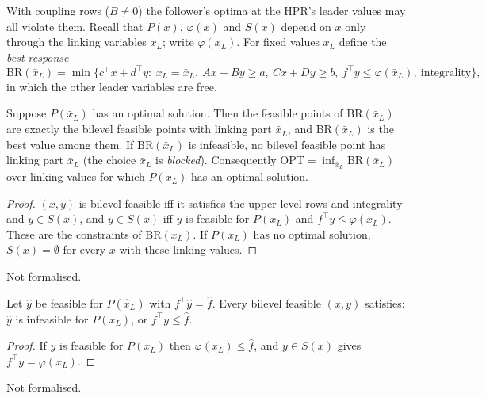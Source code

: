 With coupling rows ($B\neq 0$) the follower's optima at the HPR's leader
values may all violate them. Recall that $P(x)$, $\varphi(x)$ and $S(x)$ depend
on $x$ only through the linking variables $x_L$; write $\varphi(x_L)$. For fixed
values $\bar x_L$ define the \emph{best response}
\[
  \mathrm{BR}(\bar x_L)=\min\bigl\{c^{\top}x+d^{\top}y:\ x_L=\bar x_L,\ Ax+By\ge a,\
  Cx+Dy\ge b,\ f^{\top}y\le\varphi(\bar x_L),\ \text{integrality}\bigr\},
\]
in which the other leader variables are free.

\begin{proposition}\label{prop:coupled}
Suppose $P(\bar x_L)$ has an optimal solution. Then the feasible points of
$\mathrm{BR}(\bar x_L)$ are exactly the bilevel feasible points with linking part
$\bar x_L$, and $\mathrm{BR}(\bar x_L)$ is the best value among them. If
$\mathrm{BR}(\bar x_L)$ is infeasible, no bilevel feasible point has linking part
$\bar x_L$ (the choice $\bar x_L$ is \emph{blocked}). Consequently
$\mathrm{OPT}=\inf_{\bar x_L}\mathrm{BR}(\bar x_L)$ over linking values for which
$P(\bar x_L)$ has an optimal solution.
\end{proposition}
\begin{proof}
$(x,y)$ is bilevel feasible iff it satisfies the upper-level rows and
integrality and $y\in S(x)$, and $y\in S(x)$ iff $y$ is feasible for $P(x_L)$ and
$f^{\top}y\le\varphi(x_L)$. These are the constraints of $\mathrm{BR}(x_L)$. If
$P(\bar x_L)$ has no optimal solution, $S(x)=\emptyset$ for every $x$ with these
linking values.
\end{proof}
\noindent Not formalised.

\begin{lemma}\label{lem:vcut}
Let $\hat y$ be feasible for $P(\hat x_L)$ with $f^{\top}\hat y=\hat f$. Every bilevel
feasible $(x,y)$ satisfies: $\hat y$ is infeasible for $P(x_L)$, or
$f^{\top}y\le\hat f$.
\end{lemma}
\begin{proof}
If $\hat y$ is feasible for $P(x_L)$ then $\varphi(x_L)\le\hat f$, and $y\in S(x)$ gives
$f^{\top}y=\varphi(x_L)$.
\end{proof}
\noindent Not formalised.


